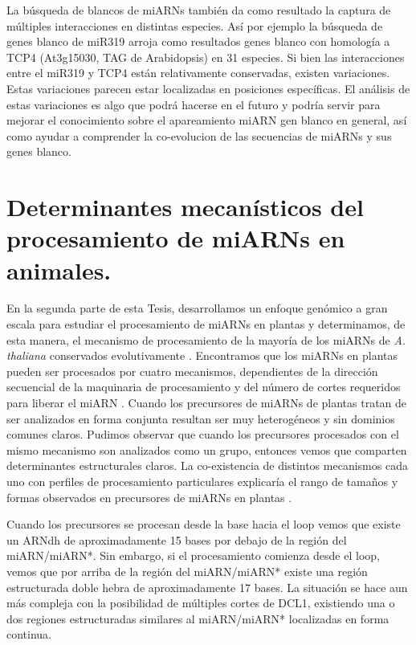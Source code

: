 La búsqueda de blancos de miARNs también da como resultado la captura de múltiples interacciones en distintas especies.
Así por ejemplo la búsqueda de genes blanco de miR319 arroja como resultados genes blanco con homología a TCP4 (At3g15030, TAG de Arabidopsis) en 31 especies.
Si bien las interacciones entre el miR319 y TCP4 están relativamente conservadas, existen variaciones.
Estas variaciones parecen estar localizadas en posiciones específicas.
El análisis de estas variaciones es algo que podrá hacerse en el futuro y podría servir para mejorar el conocimiento sobre el apareamiento miARN gen blanco en general, así como ayudar a comprender la co-evolucion de las secuencias de miARNs y sus genes blanco.

\section{Determinantes mecanísticos del procesamiento de miARNs en animales.}

En la segunda parte de esta Tesis, desarrollamos un enfoque genómico a gran escala para estudiar el procesamiento de miARNs en plantas y determinamos, de esta manera, el mecanismo de procesamiento de la mayoría de los miARNs de \textit{A. thaliana} conservados evolutivamente \citep{Bologna2013}.
Encontramos que los miARNs en plantas pueden ser procesados por cuatro mecanismos, dependientes de la dirección secuencial de la maquinaria de procesamiento y del número de cortes requeridos para liberar el miARN \citep{Bologna2013}.
Cuando los precursores de miARNs de plantas tratan de ser analizados en forma conjunta resultan ser muy heterogéneos y sin dominios comunes claros.
Pudimos observar que cuando los precursores procesados con el mismo mecanismo son analizados como un grupo, entonces vemos que comparten determinantes estructurales claros.
La co-existencia de distintos mecanismos cada uno con perfiles de procesamiento particulares explicaría el rango de tamaños y formas observados en precursores de miARNs en plantas \citep{Bologna2013}.

Cuando los precursores se procesan desde la base hacia el loop vemos que existe un ARNdh de aproximadamente 15 bases por debajo de la región del miARN/miARN*.
Sin embargo, si el procesamiento comienza desde el loop, vemos que por arriba de la región del miARN/miARN* existe una región estructurada doble hebra de aproximadamente 17 bases.
La situación se hace aun más compleja con la posibilidad de múltiples cortes de DCL1, existiendo una o dos regiones estructuradas similares al miARN/miARN* localizadas en forma continua.

